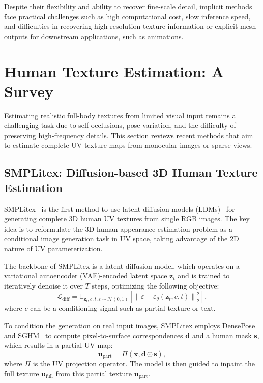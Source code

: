 Despite their flexibility and ability to recover fine-scale detail, implicit methods face practical challenges such as high computational cost, slow inference speed, and difficulties in recovering high-resolution texture information or explicit mesh outputs for downstream applications, such as animations. 



\section{Human Texture Estimation: A Survey}

Estimating realistic full-body textures from limited visual input remains a challenging task due to self-occlusions, pose variation, and the difficulty of preserving high-frequency details. This section reviews recent methods that aim to estimate complete UV texture maps from monocular images or sparse views.

\subsection{SMPLitex: Diffusion-based 3D Human Texture Estimation}

SMPLitex~\cite{casas2023smplitex} is the first method to use latent diffusion models (LDMs)~\cite{rombach2021highresolution} for generating complete 3D human UV textures from single RGB images. The key idea is to reformulate the 3D human appearance estimation problem as a conditional image generation task in UV space, taking advantage of the 2D nature of UV parameterization.

The backbone of SMPLitex is a latent diffusion model, which operates on a variational autoencoder (VAE)-encoded latent space $\mathbf{z}_t$ and is trained to iteratively denoise it over $T$ steps, optimizing the following objective:
\begin{equation}
\mathcal{L}_{\text{diff}} = \mathbb{E}_{\mathbf{z}_t, c, t, \varepsilon \sim \mathcal{N}(0,1)} \left[\left\| \varepsilon - \varepsilon_\theta(\mathbf{z}_t, c, t) \right\|_2^2\right],
\end{equation}
where $c$ can be a conditioning signal such as partial texture or text.

To condition the generation on real input images, SMPLitex employs DensePose~\cite{wu2019detectron2} and SGHM~\cite{chen2022sghm} to compute pixel-to-surface correspondences $\mathbf{d}$ and a human mask $\mathbf{s}$, which results in a partial UV map:
\begin{equation}
\mathbf{u}_{\text{part}} = \Pi(\mathbf{x}, \mathbf{d} \odot \mathbf{s}),
\end{equation}
where $\Pi$ is the UV projection operator. The model is then guided to inpaint the full texture $\mathbf{u}_{\text{full}}$ from this partial texture $\mathbf{u}_{\text{part}}$.

